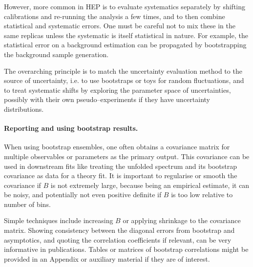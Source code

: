             However, more common in HEP is to evaluate systematics separately by shifting calibrations and re-running the analysis a few times, and to then combine statistical and systematic errors.
            One must be careful not to mix these in the same replicas unless the systematic is itself statistical in nature.
            For example, the statistical error on a background estimation can be propagated by bootstrapping the background sample generation.
            
            The overarching principle is to match the uncertainty evaluation method to the source of uncertainty, i.e. to use bootstraps or toys for random fluctuations, and to treat systematic shifts by exploring the parameter space of uncertainties, possibly with their own pseudo--experiments if they have uncertainty distributions.
            
        \paragraph{Reporting and using bootstrap results.}
            When using bootstrap ensembles, one often obtains a covariance matrix for multiple observables or parameters as the primary output.
            This covariance can be used in downstream fits like treating the unfolded spectrum and its bootstrap covariance as data for a theory fit.
            It is important to regularise or smooth the covariance if $B$ is not extremely large, because being an empirical estimate, it can be noisy, and potentially not even positive definite if $B$ is too low relative to number of bins.
            
            Simple techniques include increasing $B$ or applying shrinkage to the covariance matrix.
            Showing consistency between the diagonal errors from bootstrap and asymptotics, and quoting the correlation coefficients if relevant, can be very informative  in publications.
            Tables or matrices of bootstrap correlations might be provided in an Appendix or auxiliary material if they are of interest.
            
